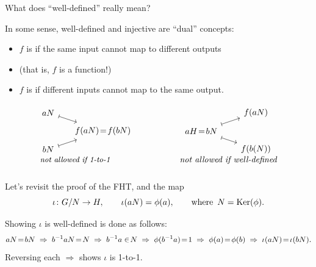 \documentclass[8pt, handout]{beamer}
\begin{document}
\begin{frame}{What does ``well-defined'' really mean?}

  In some sense, well-defined and injective are ``dual'' concepts: \smallskip
  \begin{itemize}
  \item $f$ is  if the same input cannot map to
    different outputs
  \item (that is, $f$ is a function!)
  \item $f$ is  if different inputs cannot map to
    the same output.
  \end{itemize}
  
  
  \[
  \begin{tikzpicture}[scale=.6,xscale=1.5]
    \begin{scope}[scale=2.5,inner sep=5pt]
      \node at (.5,-.8) {\small \emph{not allowed if 1-to-1}};
      \node (a) at (0,.5) {$aN$};
      \node (f) at (1,0) {$f(aN)\!=\!f(bN)$};
      \node (b) at (0,-.5) {$bN$};
      \draw[|->] (a) to (f);
      \draw[|->] (b) to (f);
    \end{scope}
    \begin{scope}[shift={(7,0)},scale=2.5,inner sep=4.5pt]
      \node at (.5,-.8) {\emph{not allowed if well-defined}};
      \node (fA) at (1,.5) {$f(aN)$};
      \node (aH) at (0,0) {$aH\!=\!bN$};
      \node (fB) at (1,-.5) {$f(b(N))$};
      \draw[|->] (aH) to (fA);
      \draw[|->] (aH) to (fB);
    \end{scope}
  \end{tikzpicture}
  \]

  Let's revisit the proof of the FHT, and the map
  \[
  \iota\colon G/N\to H,\qquad \iota(aN)=\phi(a),\qquad
  \text{where\, $N=\operatorname{Ker}(\phi)$}.
  \]

  Showing $\iota$ is well-defined is done as follows:
  \[
  aN\!=\!bN\hspace{1mm}\Rightarrow\hspace{1mm}
  b^{-1}aN\!=\!N \hspace{1mm}\Rightarrow\hspace{1mm}
  b^{-1}a\in\!N \hspace{1mm}\Rightarrow\hspace{1mm}
  \phi(b^{-1}a)\!=\!1
  \hspace{1mm}\Rightarrow\hspace{1mm}
  \phi(a)\!=\!\phi(b) \hspace{1mm}\Rightarrow\hspace{1mm}
  \iota(aN)\!=\!\iota(bN).
  \]
  Reversing each $\Rightarrow$ shows $\iota$ is 1-to-1.
  
  
\end{frame}
\end{document}
